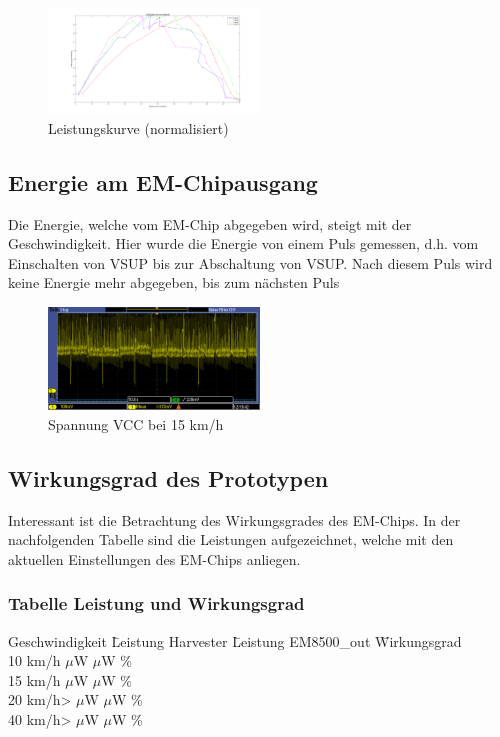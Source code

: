 \begin{figure}[ht]
    \includegraphics[width=0.5\textwidth]{4Resultate/imag/MPPHarvester.png} 
    \caption{Leistungskurve (normalisiert) }
    \label{resultat_Harvester_Spannung}
\end{figure}


\subsection{Energie am EM-Chipausgang}

Die Energie, welche vom EM-Chip abgegeben wird, steigt mit der Geschwindigkeit. Hier wurde die Energie von einem Puls gemessen, d.h. vom Einschalten von VSUP bis zur Abschaltung von VSUP. Nach diesem Puls wird keine Energie mehr abgegeben, bis zum nächsten Puls

\begin{figure}[ht]
    \includegraphics[width=0.5\textwidth]{4Resultate/imag/SpannungVCC.png} 
    \caption{Spannung VCC bei 15 km/h}
    \label{resutat_emchip_spannung}
\end{figure}


\subsection{Wirkungsgrad des Prototypen}

Interessant ist die Betrachtung des Wirkungsgrades des EM-Chips. In der nachfolgenden Tabelle sind die Leistungen aufgezeichnet, welche mit den aktuellen Einstellungen des EM-Chips anliegen.

\subsubsection*{Tabelle Leistung und Wirkungsgrad } 
\begin{tabbing}
    Geschwindigkeit \quad\= Leistung Harvester \quad\= Leistung EM8500\_out \quad\= Wirkungsgrad\\[0.8ex]
    10 km/h    $\mu$W    $\mu$W \thinspace\%  \\
    15 km/h    $\mu$W   $\mu$W \thinspace\%  \\
    20 km/h>  $\mu$W   $\mu$W \thinspace\%  \\
    40 km/h>  $\mu$W  $\mu$W \thinspace\%  \\
\end{tabbing}   

